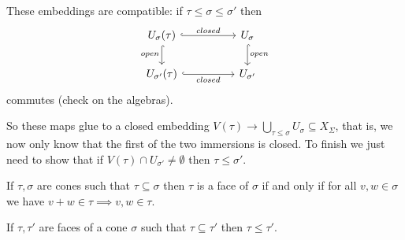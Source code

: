 These embeddings are compatible: if $\tau\leq \sigma\leq \sigma'$ then
\[\begin{tikzcd}
	{U_\sigma(\tau)} && {U_\sigma} \\
	{U_{\sigma'}(\tau)} && {U_{\sigma'}}
	\arrow["closed", hook, from=1-1, to=1-3]
	\arrow["open"', hook, from=1-1, to=2-1]
	\arrow["open", hook, from=1-3, to=2-3]
	\arrow["closed"', hook, from=2-1, to=2-3]
\end{tikzcd}\]
commutes (check on the algebras).

So these maps glue to a closed embedding $V(\tau)\to \bigcup_{\tau\leq \sigma}U_\sigma\subseteq X_{\Sigma}$, that is, we now only know that the first of the two immersions is closed. To finish we just need to show that if $V(\tau)\cap U_{\sigma'}\neq \emptyset$ then $\tau\leq \sigma'$.

\begin{lemma}[]
If $\tau,\sigma$ are cones such that $\tau\subseteq \sigma$ then $\tau$ is a face of $\sigma$ if and only if for all $v,w\in \sigma$ we have $v+w\in \tau\implies v,w\in\tau$.
\end{lemma}

\begin{corollary}[]\label{CorFaceContainedInAFaceIsAFaceOfTheFace}
If $\tau,\tau'$ are faces of a cone $\sigma$ such that $\tau\subseteq \tau'$ then $\tau\leq \tau'$.
\end{corollary}

